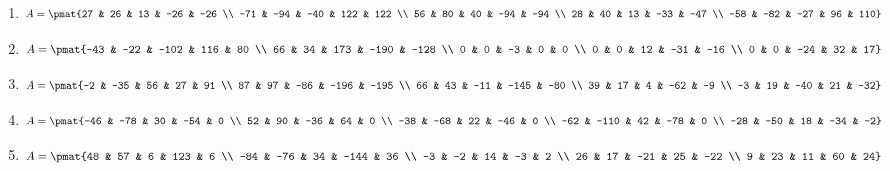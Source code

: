 \begin{enumerate}
\item

\begin{align*}
A = \pmat{27 & 26 & 13 & -26 & -26 \\ -71 & -94 & -40 & 122 & 122 \\ 56 & 80 & 40 & -94 & -94 \\ 28 & 40 & 13 & -33 & -47 \\ -58 & -82 & -27 & 96 & 110}
\end{align*}

\item

\begin{align*}
A = \pmat{-43 & -22 & -102 & 116 & 80 \\ 66 & 34 & 173 & -190 & -128 \\ 0 & 0 & -3 & 0 & 0 \\ 0 & 0 & 12 & -31 & -16 \\ 0 & 0 & -24 & 32 & 17}
\end{align*}

\item

\begin{align*}
A = \pmat{-2 & -35 & 56 & 27 & 91 \\ 87 & 97 & -86 & -196 & -195 \\ 66 & 43 & -11 & -145 & -80 \\ 39 & 17 & 4 & -62 & -9 \\ -3 & 19 & -40 & 21 & -32}
\end{align*}

\item

\begin{align*}
A = \pmat{-46 & -78 & 30 & -54 & 0 \\ 52 & 90 & -36 & 64 & 0 \\ -38 & -68 & 22 & -46 & 0 \\ -62 & -110 & 42 & -78 & 0 \\ -28 & -50 & 18 & -34 & -2}
\end{align*}

\item

\begin{align*}
A = \pmat{48 & 57 & 6 & 123 & 6 \\ -84 & -76 & 34 & -144 & 36 \\ -3 & -2 & 14 & -3 & 2 \\ 26 & 17 & -21 & 25 & -22 \\ 9 & 23 & 11 & 60 & 24}
\end{align*}


\end{enumerate}

